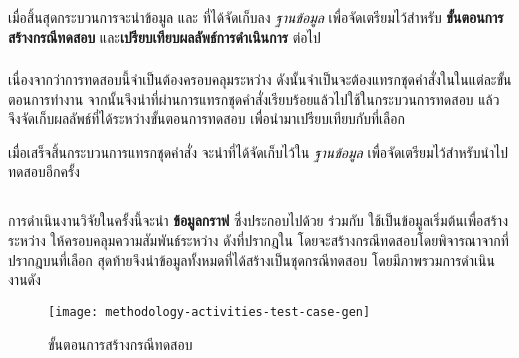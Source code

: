 เมื่อสิ้นสุดกระบวนการจะนำข้อมูล{\bf {\scg}} และ{\bf {\cfg}} ที่ได้จัดเก็บลง {\it ฐานข้อมูล} เพื่อจัดเตรียมไว้สำหรับ 
{\bf ขั้นตอนการสร้างกรณีทดสอบ} และ{\bf เปรียบเทียบผลลัพธ์การดำเนินการ} ต่อไป

\subsubsection{\sourcecodeInstrumention}
\label{sec:sub:sub:srcInstrument}

เนื่องจากว่าการทดสอบนี้จำเป็นต้องครอบคลุม{\Path}ระหว่าง{\CUT} ดังนั้นจำเป็นจะต้องแทรกชุดคำสั่งใน{\sourcecode}ในแต่ละขั้นตอนการทำงาน 
จากนั้นจึงนำ{\sourcecode}ที่ผ่านการแทรกชุดคำสั่งเรียบร้อยแล้วไปใช้ในกระบวนการทดสอบ 
แล้วจึงจัดเก็บผลลัพธ์ที่ได้ระหว่างขั้นตอนการทดสอบ เพื่อนำมาเปรียบเทียบกับ{\TestPath}ที่เลือก

%     
% 

เมื่อเสร็จสิ้นกระบวนการแทรกชุดคำสั่ง จะนำ{\sourcecode}ที่ได้จัดเก็บไว้ใน {\it ฐานข้อมูล} เพื่อจัดเตรียมไว้สำหรับนำไปทดสอบอีกครั้ง

\subsection{\testcaseGeneration}
\label{sec:sub:tcg}

การดำเนินงานวิจัยในครั้งนี้จะนำ {\bf ข้อมูลกราฟ} ซึ่งประกอบไปด้วย {\it {\scg}} ร่วมกับ{\it {\cfg}} ใช้เป็นข้อมูลเริ่มต้นเพื่อสร้าง{\TestPath}
ระหว่าง{\CUT} ให้ครอบคลุมความสัมพันธ์ระหว่าง{\class} ดังที่ปรากฎใน{\scg} โดยจะสร้างกรณีทดสอบโดยพิจารณาจาก{\PredicateNode}ที่ปรากฎบน{\TestPath}ที่เลือก 
สุดท้ายจึงนำข้อมูลทั้งหมดที่ได้สร้างเป็นชุดกรณีทดสอบ โดยมีภาพรวมการดำเนินงานดัง 

\begin{figure}[ht!]
    \centering
    \texttt{[image: methodology-activities-test-case-gen]}
    \caption{ขั้นตอนการสร้างกรณีทดสอบ}
    \label{fig:testcaseGenerationActivity}
\end{figure}

